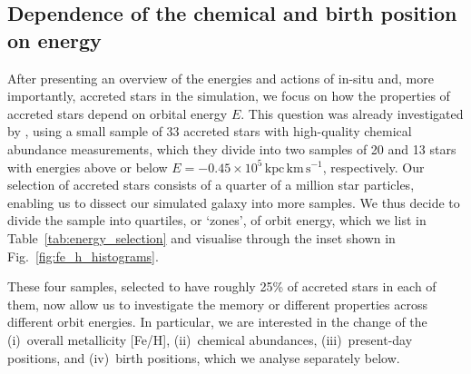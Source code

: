 \documentclass[fleqn,usenatbib]{mnras}
\begin{document}
\subsection{Dependence of the chemical and birth position on energy} \label{sec:analysis_chemodynamic_memory}

After presenting an overview of the energies and actions of in-situ and, more importantly, accreted stars in the simulation, we focus on how the properties of accreted stars depend on orbital energy $E$. This question was already investigated by \citet{Skuladottir2025}, using a small sample of 33 accreted stars with high-quality chemical abundance measurements, which they divide into two samples of 20 and 13 stars with energies above or below $E = -0.45\times10^{5}\,\mathrm{kpc\,km\,s^{-1}}$, respectively. Our selection of accreted stars consists of a quarter of a million star particles, enabling us to dissect our simulated galaxy into more samples. We thus decide to divide the sample into quartiles, or `zones', of orbit energy, which we list in Table~\ref{tab:energy_selection} and visualise through the inset shown in Fig.~\ref{fig:fe_h_histograms}.

These four samples, selected to have roughly 25\% of accreted stars in each of them, now allow us to investigate the memory or different properties across different orbit energies. In particular, we are interested in the change of the (i)~overall metallicity [Fe/H], (ii)~chemical abundances, (iii)~present-day positions, and (iv)~birth positions, which we analyse separately below.
\end{document}
